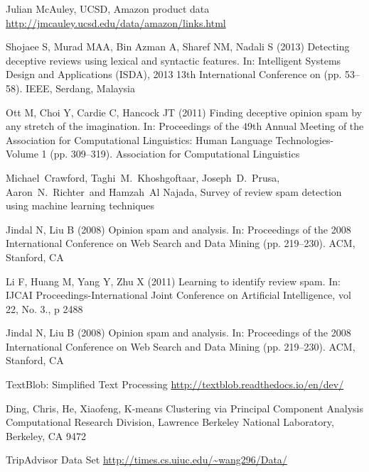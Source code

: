 \documentclass[journal, a4paper]{IEEEtran}
\begin{document}
\begin{thebibliography}{9}
    Julian McAuley, UCSD, Amazon product data
    \url{http://jmcauley.ucsd.edu/data/amazon/links.html}

    Shojaee S, Murad MAA, Bin Azman A, Sharef NM, Nadali S (2013) Detecting deceptive reviews using lexical and syntactic
    features. In: Intelligent Systems Design and Applications (ISDA), 2013 13th International Conference on (pp. 53–58). IEEE,
    Serdang, Malaysia

    Ott M, Choi Y, Cardie C, Hancock JT (2011) Finding deceptive opinion spam by any stretch of the imagination. In: Proceedings of the 49th Annual Meeting of the Association for Computational Linguistics: Human Language Technologies-Volume 1 (pp. 309–319). Association for Computational Linguistics

    Michael Crawford, Taghi M. Khoshgoftaar, Joseph D. Prusa,  Aaron N. Richter and Hamzah Al Najada,
    Survey of review spam detection using machine learning techniques

    Jindal N, Liu B (2008) Opinion spam and analysis. In: Proceedings of the 2008 International Conference on Web
    Search and Data Mining (pp. 219–230). ACM, Stanford, CA

    Li F, Huang M, Yang Y, Zhu X (2011) Learning to identify review spam. In: IJCAI Proceedings-International Joint
    Conference on Artificial Intelligence, vol 22, No. 3., p 2488

    Jindal N, Liu B (2008) Opinion spam and analysis. In: Proceedings of the 2008 International Conference on Web
    Search and Data Mining (pp. 219–230). ACM, Stanford, CA

    TextBlob: Simplified Text Processing
    \url{http://textblob.readthedocs.io/en/dev/}

    Ding, Chris, He, Xiaofeng, K-means Clustering via Principal Component Analysis
    Computational Research Division, Lawrence Berkeley National Laboratory, Berkeley, CA 9472

    TripAdvisor Data Set
    \url{http://times.cs.uiuc.edu/~wang296/Data/}
\end{thebibliography}
\end{document}
